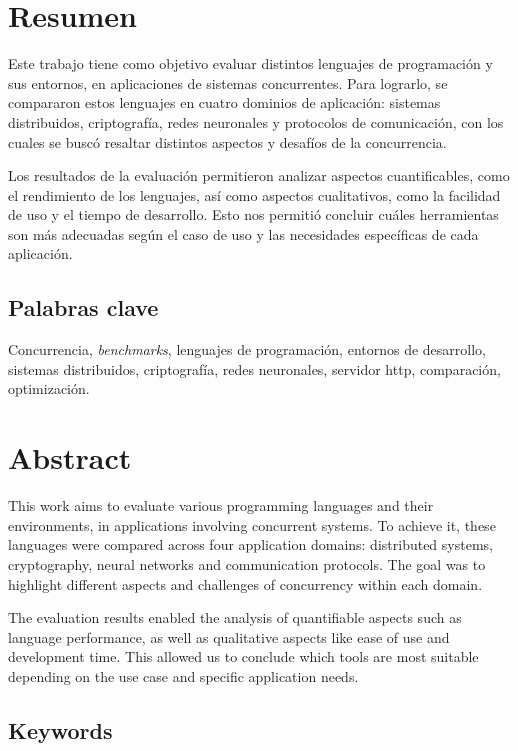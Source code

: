 \documentclass[11pt]{article}
\let\Oldsection\section
\renewcommand{\section}{\FloatBarrier\Oldsection}
\let\Oldsubsection\subsection
\renewcommand{\subsection}{\FloatBarrier\Oldsubsection}
\newcommand{\english}[1]{\textit{#1}}
\begin{document}


\tableofcontents
\newpage

\section{Resumen}


Este trabajo tiene como objetivo evaluar distintos lenguajes de programación y sus entornos, en aplicaciones de sistemas concurrentes. Para lograrlo, se compararon estos lenguajes en cuatro dominios de aplicación: sistemas distribuidos, criptografía, redes neuronales y protocolos de comunicación, con los cuales se buscó resaltar distintos aspectos y desafíos de la concurrencia.

Los resultados de la evaluación permitieron analizar aspectos cuantificables, como el rendimiento de los lenguajes, así como aspectos cualitativos, como la facilidad de uso y el tiempo de desarrollo. Esto nos permitió concluir cuáles herramientas son más adecuadas según el caso de uso y las necesidades específicas de cada aplicación.

\subsection{Palabras clave}

Concurrencia, \english{benchmarks}, lenguajes de programación, entornos de desarrollo, sistemas distribuidos, criptografía, redes neuronales, servidor http, comparación, optimización.

\section{Abstract}

This work aims to evaluate various programming languages and their environments, in applications involving concurrent systems. To achieve it, these languages were compared across four application domains: distributed systems, cryptography, neural networks and communication protocols. The goal was to highlight different aspects and challenges of concurrency within each domain.

The evaluation results enabled the analysis of quantifiable aspects such as language performance, as well as qualitative aspects like ease of use and development time. This allowed us to conclude which tools are most suitable depending on the use case and specific application needs.

\subsection{Keywords}
\end{document}
